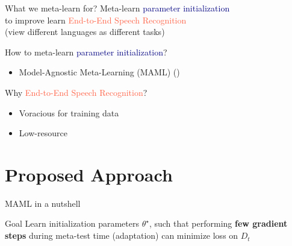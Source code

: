 \documentclass{beamer}
\begin{document}
\begin{frame}[t]{What we meta-learn for?}
  \centering Meta-learn \textcolor{navy}{parameter initialization} \\ to improve learn \textcolor{tomato}{End-to-End Speech Recognition} \\
  (view different languages as different tasks)

  \pause
  \flushleft How to meta-learn \textcolor{navy}{parameter initialization}?
  \begin{itemize}
    \item Model-Agnostic Meta-Learning (MAML) (\citealt{finn2017model})
  \end{itemize}

  \pause

  Why \textcolor{tomato}{End-to-End Speech Recognition}?
  \begin{itemize}
    \item Voracious for training data
    \item Low-resource 
  \end{itemize}
\end{frame}

\section{Proposed Approach}
\begin{frame}[t]{MAML in a nutshell}
  \begin{block}{Goal}
    Learn initialization parameters $\theta^\star$, such that performing \textbf{few gradient steps} during meta-test time (adaptation) can minimize loss on $D_t$
  \end{block}
  \flushright \hyperlink{overview of maml}{}
\end{frame}
\end{document}
